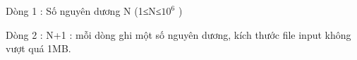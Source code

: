 Dòng 1 : Số nguyên dương N (1≤N≤$10^{6}$   )  

   Dòng 2 : N+1 : mỗi dòng ghi một số nguyên dương, kích thước file input không vượt quá 1MB.
